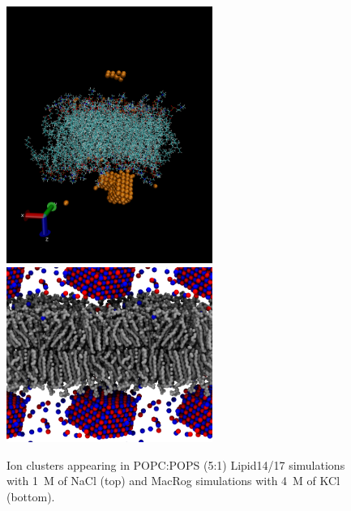\documentclass[journal=jpcbfk,manuscript=article]{achemso}
\begin{document}
\begin{figure}[]
  \centering
  \includegraphics[width=0.6\textwidth]{../Figs/lipid17cluster.png}
  \includegraphics[width=0.6\textwidth]{../Figs/MacRogIONcluster.png}
  \caption{Ion clusters appearing in POPC:POPS (5:1) Lipid14/17 simulations with 1~M of NaCl (top)
    and MacRog simulations with 4~M of KCl (bottom).
\label{ionCLUSTERS}
  }
\end{figure}
\newpage

%
\end{document}
